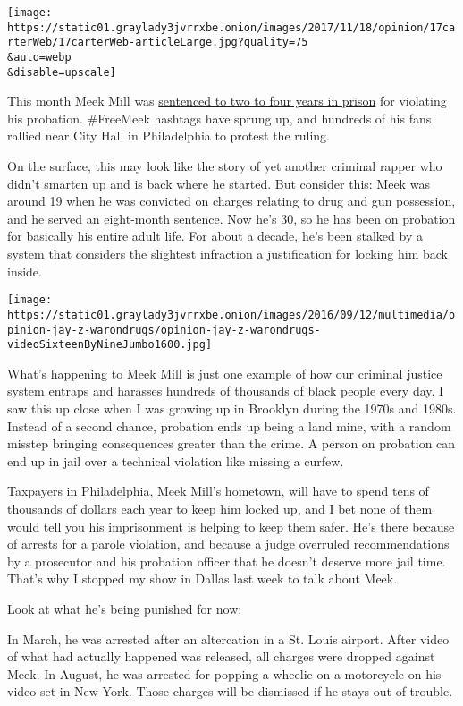 \texttt{[image: https://static01.graylady3jvrrxbe.onion/images/2017/11/18/opinion/17carterWeb/17carterWeb-articleLarge.jpg?quality=75\\\&auto=webp\\\&disable=upscale]}

This month Meek Mill was
\href{https://www.nytimes3xbfgragh.onion/2017/11/07/arts/music/meek-mill-jail.html}{sentenced
to two to four years in prison} for violating his probation. \#FreeMeek
hashtags have sprung up, and hundreds of his fans rallied near City Hall
in Philadelphia to protest the ruling.

On the surface, this may look like the story of yet another criminal
rapper who didn't smarten up and is back where he started. But consider
this: Meek was around 19 when he was convicted on charges relating to
drug and gun possession, and he served an eight-month sentence. Now he's
30, so he has been on probation for basically his entire adult life. For
about a decade, he's been stalked by a system that considers the
slightest infraction a justification for locking him back inside.

\texttt{[image: https://static01.graylady3jvrrxbe.onion/images/2016/09/12/multimedia/opinion-jay-z-warondrugs/opinion-jay-z-warondrugs-videoSixteenByNineJumbo1600.jpg]}

What's happening to Meek Mill is just one example of how our criminal
justice system entraps and harasses hundreds of thousands of black
people every day. I saw this up close when I was growing up in Brooklyn
during the 1970s and 1980s. Instead of a second chance, probation ends
up being a land mine, with a random misstep bringing consequences
greater than the crime. A person on probation can end up in jail over a
technical violation like missing a curfew.

Taxpayers in Philadelphia, Meek Mill's hometown, will have to spend tens
of thousands of dollars each year to keep him locked up, and I bet none
of them would tell you his imprisonment is helping to keep them safer.
He's there because of arrests for a parole violation, and because a
judge overruled recommendations by a prosecutor and his probation
officer that he doesn't deserve more jail time. That's why I stopped my
show in Dallas last week to talk about Meek.

Look at what he's being punished for now:

In March, he was arrested after an altercation in a St. Louis airport.
After video of what had actually happened was released, all charges were
dropped against Meek. In August, he was arrested for popping a wheelie
on a motorcycle on his video set in New York. Those charges will be
dismissed if he stays out of trouble.

